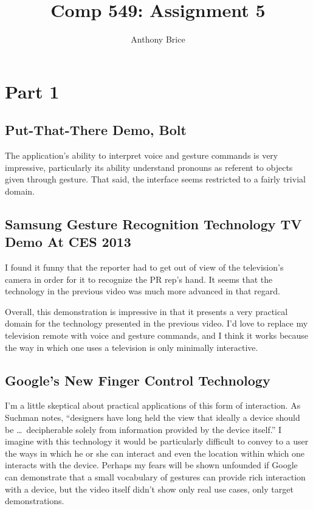 \documentclass{abrice}
\title{Comp 549: Assignment 5}
\author{Anthony Brice}
\begin{document}
\maketitle

\section{Part 1}

\subsection{Put-That-There Demo, Bolt}

The application's ability to interpret voice and gesture commands is very
impressive, particularly its ability understand pronouns as referent to objects
given through gesture. That said, the interface seems restricted to a fairly
trivial domain.

\subsection{Samsung Gesture Recognition Technology TV Demo At CES 2013}

I found it funny that the reporter had to get out of view of the television's
camera in order for it to recognize the PR rep's hand. It seems that the
technology in the previous video was much more advanced in that regard.

Overall, this demonstration is impressive in that it presents a very practical
domain for the technology presented in the previous video. I'd love to replace
my television remote with voice and gesture commands, and I think it works
because the way in which one uses a television is only minimally interactive.

\subsection{Google's New Finger Control Technology}

I'm a little skeptical about practical applications of this form of
interaction. As Suchman notes, ``designers have long held the view that ideally
a device should be \ldots\ decipherable solely from information provided by the
device itself.'' I imagine with this technology it would be particularly
difficult to convey to a user the ways in which he or she can interact and even
the location within which one interacts with the device. Perhaps my fears will
be shown unfounded if Google can demonstrate that a small vocabulary of gestures
can provide rich interaction with a device, but the video itself didn't
show only real use cases, only target demonstrations.
\end{document}
